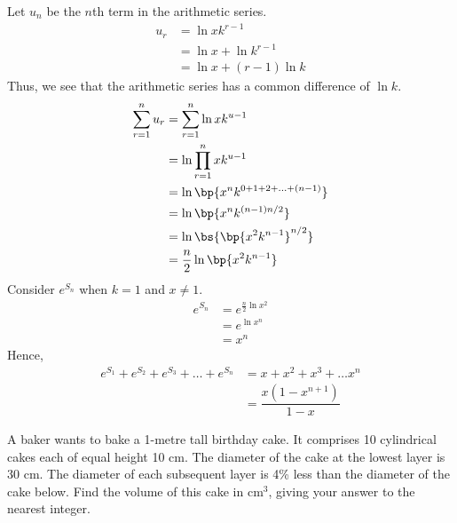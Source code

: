 \documentclass{echw}
\begin{document}
    \solution
        Let $u_n$ be the $n$th term in the arithmetic series.
        \begin{align*}
            u_r &= \ln{xk^{r-1}}\\
            &= \ln x + \ln k^{r-1}\\
            &= \ln x + (r-1)\ln k
        \end{align*}
        Thus, we see that the arithmetic series has a common difference of $\ln k$.        
        \begin{align*}
            \sum_{r=1}^n u_r &= \sum_{r=1}^n \ln{xk^{u-1}}\\
            &= \ln \prod_{r=1}^n xk^{u-1}\\
            &= \ln \bp{x^nk^{0 + 1 + 2 + \ldots + (n-1)}}\\
            &= \ln \bp{x^nk^{(n-1)n/2}}\\
            &= \ln \bs{\bp{x^2 k^{n-1}}^{n/2}}\\
            &= \dfrac{n}2 \ln \bp{x^2 k^{n-1}}
        \end{align*}
        Consider $e^{S_n}$ when $k = 1$ and $x \neq 1$.
        \begin{align*}
            e^{S_n} &= e^{\tfrac{n}2 \ln x^2}\\
            &= e^{\ln{x^n}}\\
            &= x^n
        \end{align*}
        Hence,
        \begin{align*}
            e^{S_1} + e^{S_2} + e^{S_3} + \ldots + e^{S_n} &= x + x^2 + x^3 + \ldots x^n\\
            &= \dfrac{x(1-x^{n+1})}{1-x}
        \end{align*}


    \problem{}
        A baker wants to bake a 1-metre tall birthday cake. It comprises 10 cylindrical cakes each of equal height 10 cm. The diameter of the cake at the lowest layer is 30 cm. The diameter of each subsequent layer is 4\% less than the diameter of the cake below. Find the volume of this cake in cm$^3$, giving your answer to the nearest integer.
\end{document}
